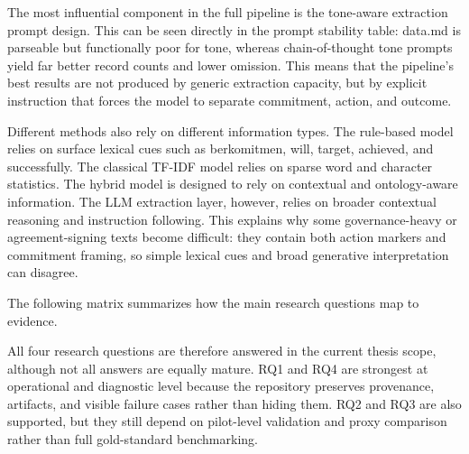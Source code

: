 \documentclass[english, online, cse, master]{dithesis}
\begin{document}
The most influential component in the full pipeline is the tone-aware extraction prompt design. This can be seen directly in the prompt stability table: data.md is parseable but functionally poor for tone, whereas chain-of-thought tone prompts yield far better record counts and lower omission. This means that the pipeline’s best results are not produced by generic extraction capacity, but by explicit instruction that forces the model to separate commitment, action, and outcome.

Different methods also rely on different information types. The rule-based model relies on surface lexical cues such as berkomitmen, will, target, achieved, and successfully. The classical TF-IDF model relies on sparse word and character statistics. The hybrid model is designed to rely on contextual and ontology-aware information. The LLM extraction layer, however, relies on broader contextual reasoning and instruction following. This explains why some governance-heavy or agreement-signing texts become difficult: they contain both action markers and commitment framing, so simple lexical cues and broad generative interpretation can disagree.

The following matrix summarizes how the main research questions map to evidence.

All four research questions are therefore answered in the current thesis scope, although not all answers are equally mature. RQ1 and RQ4 are strongest at operational and diagnostic level because the repository preserves provenance, artifacts, and visible failure cases rather than hiding them. RQ2 and RQ3 are also supported, but they still depend on pilot-level validation and proxy comparison rather than full gold-standard benchmarking.
\end{document}
